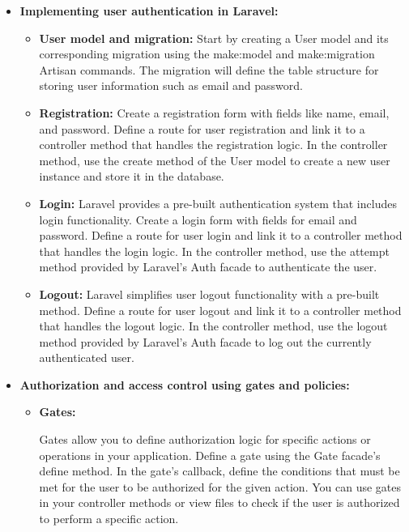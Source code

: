 \begin{itemize}
\item \textbf{Implementing user authentication in Laravel:}
\begin{itemize}

\item \textbf{User model and migration:}
        Start by creating a User model and its corresponding migration using the make:model and make:migration Artisan commands.
        The migration will define the table structure for storing user information such as email and password.

\item \textbf{Registration:}
        Create a registration form with fields like name, email, and password.
        Define a route for user registration and link it to a controller method that handles the registration logic.
        In the controller method, use the create method of the User model to create a new user instance and store it in the database.

\item \textbf{Login:}
        Laravel provides a pre-built authentication system that includes login functionality.
        Create a login form with fields for email and password.
        Define a route for user login and link it to a controller method that handles the login logic.
        In the controller method, use the attempt method provided by Laravel's Auth facade to authenticate the user.

\item \textbf{Logout:}
        Laravel simplifies user logout functionality with a pre-built method.
        Define a route for user logout and link it to a controller method that handles the logout logic.
        In the controller method, use the logout method provided by Laravel's Auth facade to log out the currently authenticated user.
\end{itemize}
\item \textbf{Authorization and access control using gates and policies:}
\begin{itemize}
    \item \textbf{Gates:}   
        
    Gates allow you to define authorization logic for specific actions or operations in your application.
        Define a gate using the Gate facade's define method.
        In the gate's callback, define the conditions that must be met for the user to be authorized for the given action.
        You can use gates in your controller methods or view files to check if the user is authorized to perform a specific action.


\end{itemize}
\end{itemize}
